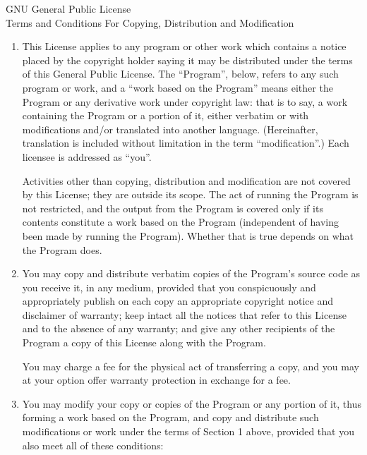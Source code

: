 \documentclass[a4paper]{article}
\begin{document}
\begin{center}
{\Large \sc GNU General Public License
\\\vspace{3mm}Terms and Conditions For Copying, Distribution and Modification}
\end{center}


\begin{enumerate}

\addtocounter{enumi}{-1}

\item 

This License applies to any program or other work which contains a notice
placed by the copyright holder saying it may be distributed under the
terms of this General Public License.  The ``Program'', below, refers to
any such program or work, and a ``work based on the Program'' means either
the Program or any derivative work under copyright law: that is to say, a
work containing the Program or a portion of it, either verbatim or with
modifications and/or translated into another language.  (Hereinafter,
translation is included without limitation in the term ``modification''.)
Each licensee is addressed as ``you''.

Activities other than copying, distribution and modification are not
covered by this License; they are outside its scope.  The act of
running the Program is not restricted, and the output from the Program
is covered only if its contents constitute a work based on the
Program (independent of having been made by running the Program).
Whether that is true depends on what the Program does.

\item You may copy and distribute verbatim copies of the Program's source
  code as you receive it, in any medium, provided that you conspicuously
  and appropriately publish on each copy an appropriate copyright notice
  and disclaimer of warranty; keep intact all the notices that refer to
  this License and to the absence of any warranty; and give any other
  recipients of the Program a copy of this License along with the Program.

You may charge a fee for the physical act of transferring a copy, and you
may at your option offer warranty protection in exchange for a fee.

\item

You may modify your copy or copies of the Program or any portion
of it, thus forming a work based on the Program, and copy and
distribute such modifications or work under the terms of Section 1
above, provided that you also meet all of these conditions:


\end{enumerate}
\end{document}
